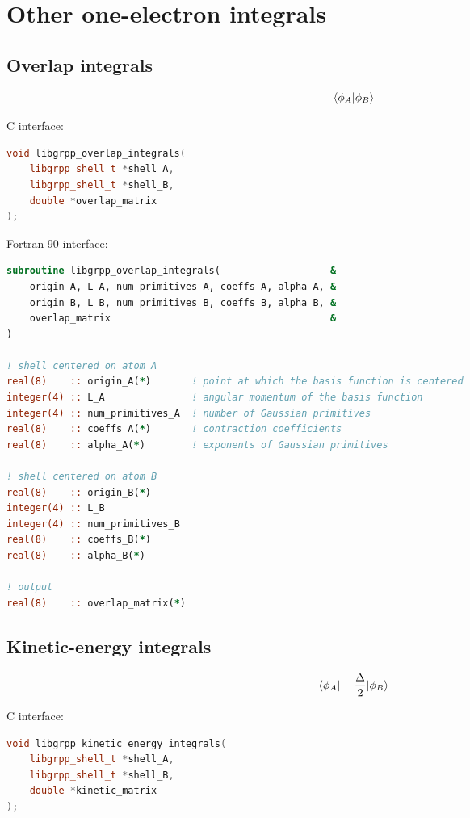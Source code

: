 \documentclass[12pt]{article}
\begin{document}
\section{Other one-electron integrals}

\subsection{Overlap integrals}

\begin{equation}
\braket{\phi_A|\phi_B}
\end{equation}

C interface:
\begin{lstlisting}[language=C++]
void libgrpp_overlap_integrals(
    libgrpp_shell_t *shell_A,
    libgrpp_shell_t *shell_B,
    double *overlap_matrix
);
\end{lstlisting}

Fortran 90 interface:
\begin{lstlisting}[language=Fortran]
subroutine libgrpp_overlap_integrals(                   &
    origin_A, L_A, num_primitives_A, coeffs_A, alpha_A, &
    origin_B, L_B, num_primitives_B, coeffs_B, alpha_B, &
    overlap_matrix                                      &
)

! shell centered on atom A
real(8)    :: origin_A(*)       ! point at which the basis function is centered
integer(4) :: L_A               ! angular momentum of the basis function
integer(4) :: num_primitives_A  ! number of Gaussian primitives
real(8)    :: coeffs_A(*)       ! contraction coefficients
real(8)    :: alpha_A(*)        ! exponents of Gaussian primitives

! shell centered on atom B
real(8)    :: origin_B(*)
integer(4) :: L_B
integer(4) :: num_primitives_B
real(8)    :: coeffs_B(*)
real(8)    :: alpha_B(*)

! output
real(8)    :: overlap_matrix(*)
\end{lstlisting}


\subsection{Kinetic-energy integrals}

\begin{equation}
\braket{\phi_A|-\frac{\Delta}{2}|\phi_B}
\end{equation}

C interface:
\begin{lstlisting}[language=C++]
void libgrpp_kinetic_energy_integrals(
    libgrpp_shell_t *shell_A,
    libgrpp_shell_t *shell_B,
    double *kinetic_matrix
);
\end{lstlisting}
\end{document}
